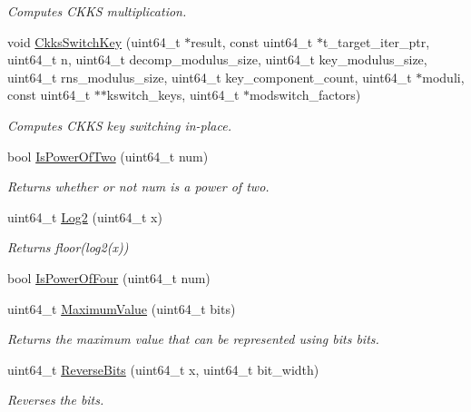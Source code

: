 \begin{DoxyCompactItemize}
\begin{DoxyCompactList}\small\item\em Computes C\+K\+KS multiplication. \end{DoxyCompactList}\item 
void \hyperlink{namespaceintel_1_1hexl_ae983051ff4c3321db4db4569d7fbe796}{Ckks\+Switch\+Key} (uint64\+\_\+t $\ast$result, const uint64\+\_\+t $\ast$t\+\_\+target\+\_\+iter\+\_\+ptr, uint64\+\_\+t n, uint64\+\_\+t decomp\+\_\+modulus\+\_\+size, uint64\+\_\+t key\+\_\+modulus\+\_\+size, uint64\+\_\+t rns\+\_\+modulus\+\_\+size, uint64\+\_\+t key\+\_\+component\+\_\+count, uint64\+\_\+t $\ast$moduli, const uint64\+\_\+t $\ast$$\ast$kswitch\+\_\+keys, uint64\+\_\+t $\ast$modswitch\+\_\+factors)
\begin{DoxyCompactList}\small\item\em Computes C\+K\+KS key switching in-\/place. \end{DoxyCompactList}\item 
bool \hyperlink{namespaceintel_1_1hexl_ada0fe74afb4384b54728cba8ec3f69cd}{Is\+Power\+Of\+Two} (uint64\+\_\+t num)
\begin{DoxyCompactList}\small\item\em Returns whether or not num is a power of two. \end{DoxyCompactList}\item 
uint64\+\_\+t \hyperlink{namespaceintel_1_1hexl_a066a83a4b122279313279a58cf440004}{Log2} (uint64\+\_\+t x)
\begin{DoxyCompactList}\small\item\em Returns floor(log2(x)) \end{DoxyCompactList}\item 
bool \hyperlink{namespaceintel_1_1hexl_a74a77227ebbd892a0cff5089f3d89010}{Is\+Power\+Of\+Four} (uint64\+\_\+t num)
\item 
uint64\+\_\+t \hyperlink{namespaceintel_1_1hexl_a9975ccaf5ec051c07ff4e3fef5c1fefb}{Maximum\+Value} (uint64\+\_\+t bits)
\begin{DoxyCompactList}\small\item\em Returns the maximum value that can be represented using {\ttfamily bits} bits. \end{DoxyCompactList}\item 
uint64\+\_\+t \hyperlink{namespaceintel_1_1hexl_aa48183a39af615227d5b14c0fdb46105}{Reverse\+Bits} (uint64\+\_\+t x, uint64\+\_\+t bit\+\_\+width)
\begin{DoxyCompactList}\small\item\em Reverses the bits. \end{DoxyCompactList}\item 
$$
\end{DoxyCompactItemize}
